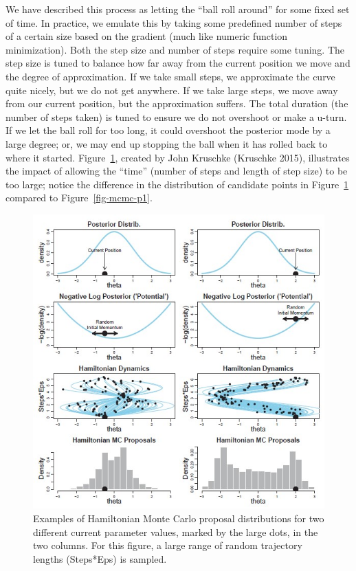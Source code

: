 \documentclass[
  letterpaper,
  DIV=11,
  numbers=noendperiod]{scrreprt}
\theoremstyle{definition}
\theoremstyle{plain}
\theoremstyle{definition}
\theoremstyle{remark}
\begin{document}
We have described this process as letting the ``ball roll around'' for
some fixed set of time. In practice, we emulate this by taking some
predefined number of steps of a certain size based on the gradient (much
like numeric function minimization). Both the step size and number of
steps require some tuning. The step size is tuned to balance how far
away from the current position we move and the degree of approximation.
If we take small steps, we approximate the curve quite nicely, but we do
not get anywhere. If we take large steps, we move away from our current
position, but the approximation suffers. The total duration (the number
of steps taken) is tuned to ensure we do not overshoot or make a u-turn.
If we let the ball roll for too long, it could overshoot the posterior
mode by a large degree; or, we may end up stopping the ball when it has
rolled back to where it started. Figure~\ref{fig-mcmc-p2}, created by
John Kruschke (Kruschke 2015), illustrates the impact of allowing the
``time'' (number of steps and length of step size) to be too large;
notice the difference in the distribution of candidate points in
Figure~\ref{fig-mcmc-p2} compared to Figure~\ref{fig-mcmc-p1}.

\begin{figure}

{\centering \includegraphics{images/Kruschke-Fig2.jpg}

}

\caption{\label{fig-mcmc-p2}Examples of Hamiltonian Monte Carlo proposal
distributions for two different current parameter values, marked by the
large dots, in the two columns. For this figure, a large range of random
trajectory lengths (Steps*Eps) is sampled.}

\end{figure}
\end{document}
